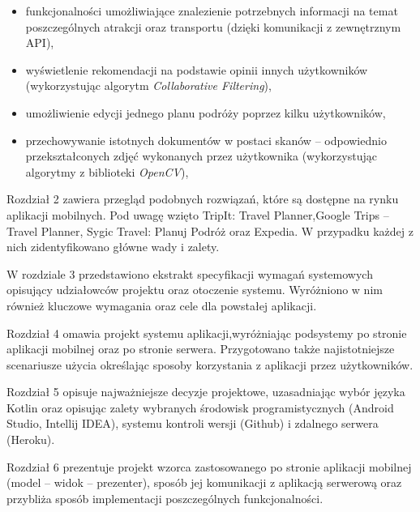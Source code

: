 \begin{itemize}

\item funkcjonalności umożliwiające znalezienie potrzebnych informacji na temat poszczególnych atrakcji oraz transportu (dzięki komunikacji z zewnętrznym API),

\item  wyświetlenie rekomendacji na podstawie opinii innych użytkowników (wykorzystując algorytm \textit{Collaborative Filtering}),

\item umożliwienie edycji jednego planu podróży poprzez kilku użytkowników,

\item przechowywanie istotnych dokumentów w postaci skanów – odpowiednio przekształconych zdjęć wykonanych przez użytkownika (wykorzystując algorytmy z biblioteki \textit{OpenCV}),

\end{itemize}

\par Rozdział 2 zawiera przegląd podobnych rozwiązań, które są dostępne na rynku aplikacji mobilnych. Pod uwagę wzięto TripIt: Travel Planner,Google Trips -- Travel Planner, Sygic Travel: Planuj Podróż oraz Expedia. W przypadku każdej z nich zidentyfikowano główne wady i zalety.

\par W rozdziale 3 przedstawiono ekstrakt specyfikacji wymagań systemowych opisujący udziałowców projektu oraz otoczenie systemu. Wyróżniono w nim również kluczowe wymagania oraz cele dla powstałej aplikacji.

\par Rozdział 4 omawia projekt systemu aplikacji,wyróżniając podsystemy po stronie aplikacji mobilnej oraz po stronie serwera. Przygotowano także najistotniejsze scenariusze użycia określając sposoby korzystania z aplikacji przez użytkowników.

\par Rozdział 5 opisuje najważniejsze decyzje projektowe, uzasadniając wybór języka Kotlin oraz opisując zalety wybranych środowisk programistycznych (Android Studio, Intellij IDEA), systemu kontroli wersji (Github) i zdalnego serwera (Heroku). 

\par Rozdział 6 prezentuje projekt wzorca zastosowanego po stronie aplikacji mobilnej (model -- widok -- prezenter), sposób jej komunikacji z aplikacją serwerową oraz przybliża sposób implementacji poszczególnych funkcjonalności.

